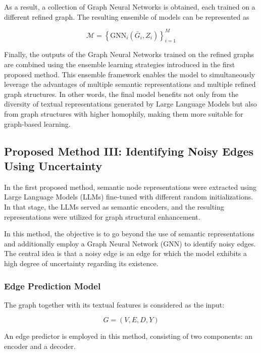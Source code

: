 \documentclass{article}
\begin{document}
As a result, a collection of Graph Neural Networks is obtained, each trained on a different refined graph. The resulting ensemble of models can be represented as

\begin{equation}
\mathcal{M} = \left\{ \mathrm{GNN}_i(\bar{G}_i, Z_i) \right\}_{i=1}^{M}
\label{eq:gnn_ensemble}
\end{equation}

Finally, the outputs of the Graph Neural Networks trained on the refined graphs are combined using the ensemble learning strategies introduced in the first proposed method. This ensemble framework enables the model to simultaneously leverage the advantages of multiple semantic representations and multiple refined graph structures. In other words, the final model benefits not only from the diversity of textual representations generated by Large Language Models but also from graph structures with higher homophily, making them more suitable for graph-based learning.

\subsection{Proposed Method III: Identifying Noisy Edges Using Uncertainty}

In the first proposed method, semantic node representations were extracted using Large Language Models (LLMs) fine-tuned with different random initializations. In that stage, the LLMs served as semantic encoders, and the resulting representations were utilized for graph structural enhancement.

In this method, the objective is to go beyond the use of semantic representations and additionally employ a Graph Neural Network (GNN) to identify noisy edges. The central idea is that a noisy edge is an edge for which the model exhibits a high degree of uncertainty regarding its existence.

\subsubsection{Edge Prediction Model}

The graph together with its textual features is considered as the input:

\begin{equation}
G = (V, E, D, Y)
\label{eq:input_graph_uncertainty}
\end{equation}

An edge predictor is employed in this method, consisting of two components: an encoder and a decoder.
\end{document}
